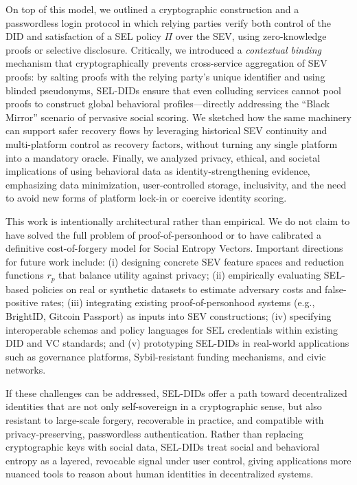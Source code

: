 \documentclass[11pt]{article}
\begin{document}
On top of this model, we outlined a cryptographic construction and a passwordless login protocol in which relying parties verify both control of the DID and satisfaction of a SEL policy $\Pi$ over the SEV, using zero-knowledge proofs or selective disclosure. Critically, we introduced a \emph{contextual binding} mechanism that cryptographically prevents cross-service aggregation of SEV proofs: by salting proofs with the relying party's unique identifier and using blinded pseudonyms, SEL-DIDs ensure that even colluding services cannot pool proofs to construct global behavioral profiles---directly addressing the ``Black Mirror'' scenario of pervasive social scoring. We sketched how the same machinery can support safer recovery flows by leveraging historical SEV continuity and multi-platform control as recovery factors, without turning any single platform into a mandatory oracle. Finally, we analyzed privacy, ethical, and societal implications of using behavioral data as identity-strengthening evidence, emphasizing data minimization, user-controlled storage, inclusivity, and the need to avoid new forms of platform lock-in or coercive identity scoring.

This work is intentionally architectural rather than empirical. We do not claim to have solved the full problem of proof-of-personhood or to have calibrated a definitive cost-of-forgery model for Social Entropy Vectors. Important directions for future work include: (i) designing concrete SEV feature spaces and reduction functions $r_p$ that balance utility against privacy; (ii) empirically evaluating SEL-based policies on real or synthetic datasets to estimate adversary costs and false-positive rates; (iii) integrating existing proof-of-personhood systems (e.g., BrightID, Gitcoin Passport) as inputs into SEV constructions; (iv) specifying interoperable schemas and policy languages for SEL credentials within existing DID and VC standards; and (v) prototyping SEL-DIDs in real-world applications such as governance platforms, Sybil-resistant funding mechanisms, and civic networks.

If these challenges can be addressed, SEL-DIDs offer a path toward decentralized identities that are not only self-sovereign in a cryptographic sense, but also resistant to large-scale forgery, recoverable in practice, and compatible with privacy-preserving, passwordless authentication. Rather than replacing cryptographic keys with social data, SEL-DIDs treat social and behavioral entropy as a layered, revocable signal under user control, giving applications more nuanced tools to reason about human identities in decentralized systems.



\end{document}
